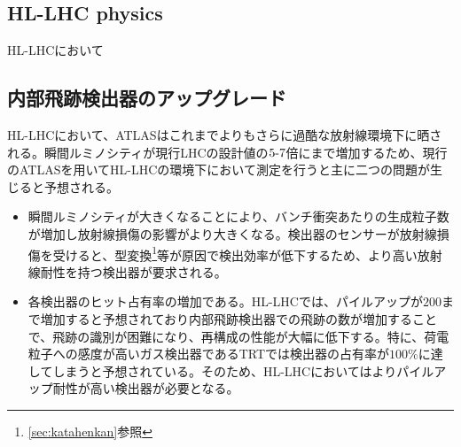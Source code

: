 \subsection{HL-LHC physics}
\label{sec:hl-lhc-physics}


HL-LHCにおいて



\subsection{内部飛跡検出器のアップグレード}
\label{sec:hl-lhc-itk}
HL-LHCにおいて、ATLASはこれまでよりもさらに過酷な放射線環境下に晒される。瞬間ルミノシティが現行LHCの設計値の$5 \mathchar`- 7$倍にまで増加するため、現行のATLASを用いてHL-LHCの環境下において測定を行うと主に二つの問題が生じると予想される。
\begin{itemize}
\item 瞬間ルミノシティが大きくなることにより、バンチ衝突あたりの生成粒子数が増加し放射線損傷の影響がより大きくなる。検出器のセンサーが放射線損傷を受けると、型変換\footnote{\ref{sec:katahenkan}参照}等が原因で検出効率が低下するため、より高い放射線耐性を持つ検出器が要求される。
\item 各検出器のヒット占有率の増加である。HL-LHCでは、パイルアップが$200$まで増加すると予想されており内部飛跡検出器での飛跡の数が増加することで、飛跡の識別が困難になり、再構成の性能が大幅に低下する。特に、荷電粒子への感度が高いガス検出器であるTRTでは検出器の占有率が$100\si{\%}$に達してしまうと予想されている。そのため、HL-LHCにおいてはよりパイルアップ耐性が高い検出器が必要となる。
\end{itemize}

